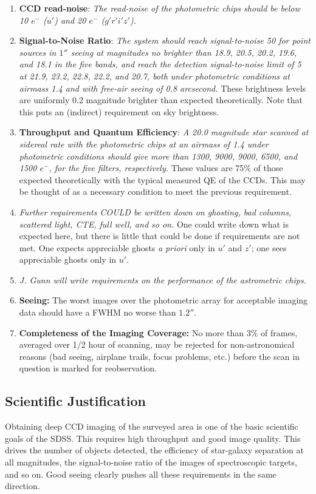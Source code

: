 \begin{enumerate}
\item {\bf CCD read-noise}: {\it The read-noise of the photometric chips
should be below 10 $e^-$ ($u'$) and 20 $e^-$ ($g'r'i'z'$). }
\item {\bf Signal-to-Noise Ratio}:  {\it The system should
reach signal-to-noise 50 for point sources in $1''$ seeing at
magnitudes no brighter than  
18.9, 20.5, 20.2, 19.6, and 18.1 in the five bands, and reach the
detection signal-to-noise limit of 5 at 21.9, 23.2, 22.8, 22.2, and
20.7, both under photometric conditions at airmass 1.4 and with
free-air seeing of 0.8 arcsecond.} These brightness levels are
uniformly 0.2 magnitude brighter than expected theoretically.  Note
that this puts an (indirect) requirement on sky brightness. 
\item {\bf Throughput and Quantum Efficiency}:  {\it A 20.0 magnitude
star scanned at sidereal rate with the photometric chips at an airmass
of 1.4 under photometric conditions should give
more than 1300, 9000, 9000, 6500, and 1500 $e^-$, 
for the five filters, respectively.} These values are 75\% of those
expected theoretically with the typical measured QE of the CCDs.  This
may be thought of as a necessary condition to meet the previous
requirement. 

\item {\it Further requirements COULD be written down on ghosting,
bad columns, scattered light, CTE, full well, and so on.}
One could write down what is expected here, but there is little that
could be done if requirements are not met.  One expects appreciable
ghosts {\it a priori} only in $u'$ and $z'$; one sees appreciable
ghosts only in $u'$. 

\item {\it J. Gunn will write requirements on the performance of
the astrometric chips.}

\item {\bf Seeing:} The worst images over the photometric array for
acceptable imaging data should have a FWHM no worse than $1.2''$. 

\item {\bf Completeness of the Imaging Coverage:} No more than 3\% of
frames, averaged over 1/2 hour of scanning, may be rejected for
non-astronomical reasons (bad seeing, airplane trails, focus problems,
etc.) before the scan in question is marked for reobservation. 
\end{enumerate}

\subsection{Scientific Justification}
Obtaining deep CCD imaging of the surveyed area is one of the basic
scientific goals of the SDSS.  This requires high throughput and good
image quality. This drives the number of objects
detected, the efficiency of star-galaxy separation at all magnitudes,
the signal-to-noise ratio of the images of spectroscopic targets, and
so on.   Good seeing clearly pushes all these requirements in the same
direction. 

